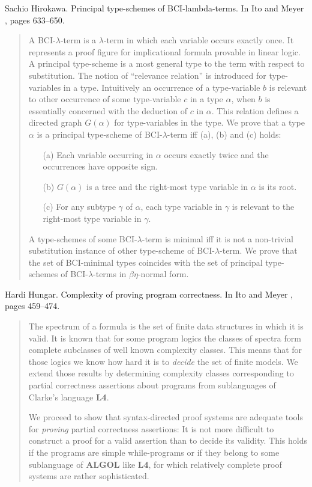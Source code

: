 \begin{thebibliography}{10}
Sachio Hirokawa.
\newblock Principal type-schemes of {BCI}-lambda-terms.
\newblock In Ito and Meyer \cite{TACS91}, pages 633--650.
\begin{quotation}
A BCI-$\lambda$-term is a $\lambda$-term in which each variable occurs exactly
  once. It represents a proof figure for implicational formula provable in
  linear logic. A principal type-scheme is a most general type to the term with
  respect to substitution. The notion of ``relevance relation'' is introduced
  for type-variables in a type. Intuitively an occurrence of a type-variable
  $b$ is relevant to other occurrence of some type-variable $c$ in a type
  $\alpha$, when $b$ is essentially concerned with the deduction of $c$ in
  $\alpha$. This relation defines a directed graph $G(\alpha)$ for
  type-variables in the type. We prove that a type $\alpha$ is a principal
  type-scheme of BCI-$\lambda$-term iff (a), (b) and (c) holds: \begin{itemize}
  \item[(a)] Each variable occurring in $\alpha$ occurs exactly twice and the
  occurrences have opposite sign. \item[(b)] $G(\alpha)$ is a tree and the
  right-most type variable in $\alpha$ is its root. \item[(c)] For any subtype
  $\gamma$ of $\alpha$, each type variable in $\gamma$ is relevant to the
  right-most type variable in $\gamma$. \end{itemize} A type-schemes of some
  BCI-$\lambda$-term is minimal iff it is not a non-trivial substitution
  instance of other type-scheme of BCI-$\lambda$-term. We prove that the set of
  BCI-minimal types coincides with the set of principal type-schemes of
  BCI-$\lambda$-terms in $\beta \eta$-normal form.
\end{quotation}

Hardi Hungar.
\newblock Complexity of proving program correctness.
\newblock In Ito and Meyer \cite{TACS91}, pages 459--474.
\begin{quotation}
The spectrum of a formula is the set of finite data structures in which it is
  valid. It is known that for some program logics the classes of spectra form
  complete subclasses of well known complexity classes. This means that for
  those logics we know how hard it is to {\em decide} the set of finite models.
  We extend those results by determining complexity classes corresponding to
  partial correctness assertions about programs from sublanguages of Clarke's
  language {\bf L4}. \par We proceed to show that syntax-directed proof systems
  are adequate tools for {\em proving} partial correctness assertions: It is
  not more difficult to construct a proof for a valid assertion than to decide
  its validity. This holds if the programs are simple while-programs or if they
  belong to some sublanguage of {\bf ALGOL} like {\bf L4}, for which relatively
  complete proof systems are rather sophisticated.
\end{quotation}


\end{thebibliography}
